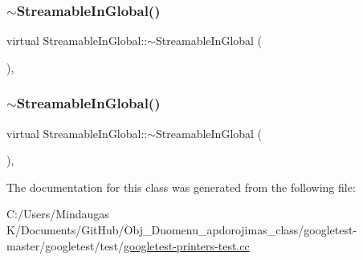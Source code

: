 \subsubsection{\texorpdfstring{$\sim$StreamableInGlobal()}{~StreamableInGlobal()}\hspace{0.1cm}{\footnotesize\ttfamily [2/3]}}
{\footnotesize\ttfamily virtual Streamable\+In\+Global\+::$\sim$\+Streamable\+In\+Global (\begin{DoxyParamCaption}{ }\end{DoxyParamCaption})\hspace{0.3cm}{\ttfamily [inline]}, {\ttfamily [virtual]}}

\mbox{\label{class_streamable_in_global_a20cd7676e22a7a8bbad17c42681d46bf}} 
\subsubsection{\texorpdfstring{$\sim$StreamableInGlobal()}{~StreamableInGlobal()}\hspace{0.1cm}{\footnotesize\ttfamily [3/3]}}
{\footnotesize\ttfamily virtual Streamable\+In\+Global\+::$\sim$\+Streamable\+In\+Global (\begin{DoxyParamCaption}{ }\end{DoxyParamCaption})\hspace{0.3cm}{\ttfamily [inline]}, {\ttfamily [virtual]}}



The documentation for this class was generated from the following file\+:\begin{DoxyCompactItemize}
\item 
C\+:/\+Users/\+Mindaugas K/\+Documents/\+Git\+Hub/\+Obj\+\_\+\+Duomenu\+\_\+apdorojimas\+\_\+class/googletest-\/master/googletest/test/\mbox{\hyperlink{googletest-master_2googletest_2test_2googletest-printers-test_8cc}{googletest-\/printers-\/test.\+cc}}\end{DoxyCompactItemize}
